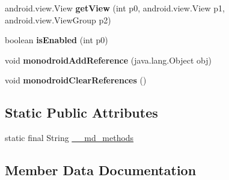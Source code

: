 \begin{DoxyCompactItemize}
\item 
\mbox{\label{classmd5b60ffeb829f638581ab2bb9b1a7f4f3f_1_1_list_view_adapter_ae2fe00b727ac49a6127f035217453806}} 
android.\+view.\+View {\bfseries get\+View} (int p0, android.\+view.\+View p1, android.\+view.\+View\+Group p2)
\item 
\mbox{\label{classmd5b60ffeb829f638581ab2bb9b1a7f4f3f_1_1_list_view_adapter_a15dc86c11acd1d564985b671571b2d78}} 
boolean {\bfseries is\+Enabled} (int p0)
\item 
\mbox{\label{classmd5b60ffeb829f638581ab2bb9b1a7f4f3f_1_1_list_view_adapter_a1325a463fbf8e693412780668a9e9a7e}} 
void {\bfseries monodroid\+Add\+Reference} (java.\+lang.\+Object obj)
\item 
\mbox{\label{classmd5b60ffeb829f638581ab2bb9b1a7f4f3f_1_1_list_view_adapter_a92941f5776f2c562a319f8c0cce9f2a4}} 
void {\bfseries monodroid\+Clear\+References} ()
\end{DoxyCompactItemize}
\subsection*{Static Public Attributes}
\begin{DoxyCompactItemize}
\item 
static final String \hyperlink{classmd5b60ffeb829f638581ab2bb9b1a7f4f3f_1_1_list_view_adapter_a3484b09d18c193e3a6efbf9abd22592a}{\+\_\+\+\_\+md\+\_\+methods}
\end{DoxyCompactItemize}


\subsection{Member Data Documentation}
\mbox{\label{classmd5b60ffeb829f638581ab2bb9b1a7f4f3f_1_1_list_view_adapter_a3484b09d18c193e3a6efbf9abd22592a}} 
